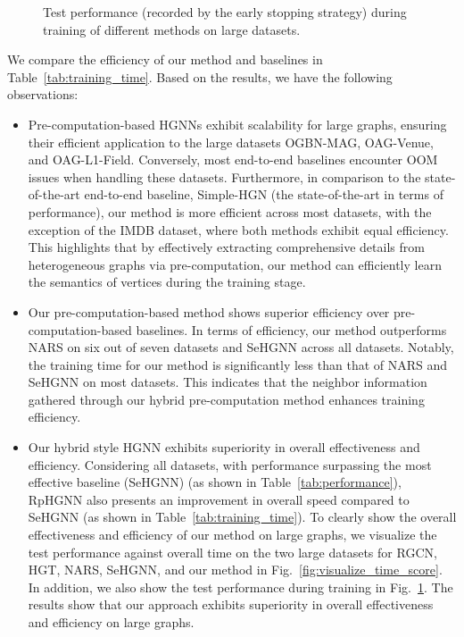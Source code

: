 \documentclass[lettersize,journal]{IEEEtran}
\begin{document}
\begin{figure}[!t]
\centering
{}
\caption{
Test performance (recorded by the early stopping strategy) during training of different methods on large datasets.
}
\label{fig:visualize_training_curve} \end{figure}





We compare the efficiency of our method and baselines in Table~\ref{tab:training_time}.
Based on the results, we have the following observations:
\begin{itemize}
\item Pre-computation-based HGNNs exhibit scalability for large graphs, ensuring their efficient application to the large datasets OGBN-MAG, OAG-Venue, and OAG-L1-Field. 
Conversely, most end-to-end baselines encounter OOM issues when handling these datasets.
Furthermore, in comparison to the state-of-the-art end-to-end baseline, Simple-HGN (the state-of-the-art in terms of performance), our method is more efficient across most datasets, with the exception of the IMDB dataset, where both methods exhibit equal efficiency.
This highlights that by effectively extracting comprehensive details from heterogeneous graphs via pre-computation, our method can efficiently learn the semantics of vertices during the training stage.
\item Our pre-computation-based method shows superior efficiency over pre-computation-based baselines.
In terms of efficiency, our method outperforms NARS on six out of seven datasets and SeHGNN across all datasets.
Notably, the training time for our method is significantly less than that of NARS and SeHGNN on most datasets.
This indicates that the neighbor information gathered through our hybrid pre-computation method enhances training efficiency.
\item Our hybrid style HGNN exhibits superiority in overall effectiveness and efficiency. 
Considering all datasets, with performance surpassing the most effective baseline (SeHGNN) (as shown in Table~\ref{tab:performance}), RpHGNN also presents an improvement in overall speed compared to SeHGNN (as shown in Table~\ref{tab:training_time}).
To clearly show the overall effectiveness and efficiency of our method on large graphs, we visualize the test performance against overall time on the two large datasets for RGCN, HGT, NARS, SeHGNN, and our method in Fig.~\ref{fig:visualize_time_score}.
In addition, we also show the test performance during training in Fig.~\ref{fig:visualize_training_curve}.
The results show that our approach exhibits superiority in overall effectiveness and efficiency on large graphs.
\end{itemize}
\end{document}
